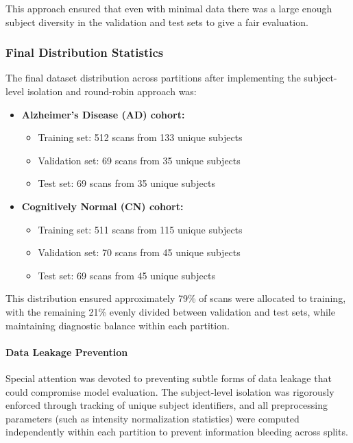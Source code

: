 \documentclass[12pt, a4paper]{article}
\begin{document}
This approach ensured that even with minimal data there was a large enough subject diversity in the validation and test sets to give a fair evaluation.

\subsubsection{Final Distribution Statistics}

The final dataset distribution across partitions after implementing the subject-level isolation and round-robin approach was:

\begin{itemize}
    \item \textbf{Alzheimer's Disease (AD) cohort:}
    \begin{itemize}
        \item Training set: 512 scans from 133 unique subjects
        \item Validation set: 69 scans from 35 unique subjects
        \item Test set: 69 scans from 35 unique subjects
    \end{itemize}
    \item \textbf{Cognitively Normal (CN) cohort:}
    \begin{itemize}
        \item Training set: 511 scans from 115 unique subjects
        \item Validation set: 70 scans from 45 unique subjects
        \item Test set: 69 scans from 45 unique subjects
    \end{itemize}
\end{itemize}

This distribution ensured approximately 79\% of scans were allocated to training, with the remaining 21\% evenly divided between validation and test sets, while maintaining diagnostic balance within each partition.

\paragraph{Data Leakage Prevention}

Special attention was devoted to preventing subtle forms of data leakage that could compromise model evaluation. The subject-level isolation was rigorously enforced through tracking of unique subject identifiers, and all preprocessing parameters (such as intensity normalization statistics) were computed independently within each partition to prevent information bleeding across splits.
\end{document}

